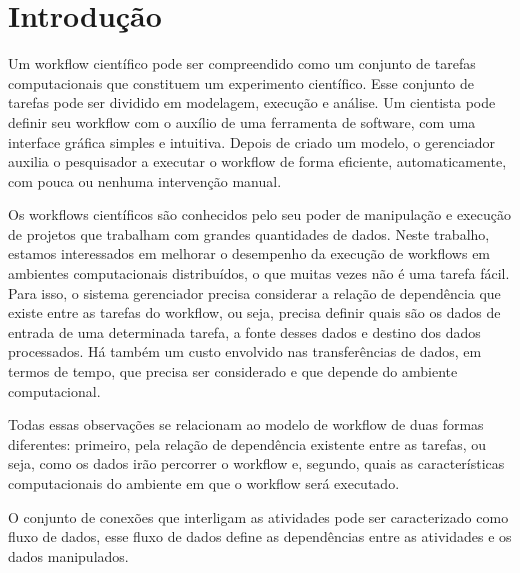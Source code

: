 
\section{Introdução}

	Um workflow científico pode ser compreendido como um conjunto de tarefas computacionais que constituem um experimento científico\cite{Junior2012}. Esse conjunto de tarefas pode ser dividido em modelagem, execução e análise. Um cientista pode definir seu workflow com o auxílio de uma ferramenta de software, com uma interface gráfica simples e intuitiva. Depois de criado um modelo, o gerenciador auxilia o pesquisador a executar o workflow de forma eficiente, automaticamente, com pouca ou nenhuma intervenção manual.
	
	Os workflows científicos são conhecidos pelo seu poder de manipulação e execução de projetos que trabalham com grandes quantidades de dados. Neste trabalho, estamos interessados em melhorar o desempenho da execução de workflows em ambientes computacionais distribuídos, o que muitas vezes não é uma tarefa fácil. Para isso, o sistema gerenciador precisa considerar a relação de dependência que existe entre as tarefas do workflow, ou seja, precisa definir quais são os dados de entrada de uma determinada tarefa, a fonte desses dados e destino dos dados processados. Há também um custo envolvido nas transferências de dados, em termos de tempo, que precisa ser considerado e que depende do ambiente computacional.

	Todas essas observações se relacionam ao modelo de workflow de duas formas diferentes: primeiro, pela relação de dependência existente entre as tarefas, ou seja, como os dados irão percorrer o workflow e, segundo, quais as características computacionais do ambiente em que o workflow será executado.
	
	O conjunto de conexões que interligam as atividades pode ser caracterizado como fluxo de dados, esse fluxo de dados define as dependências entre as atividades e os dados manipulados\cite{Teixeira2013}.